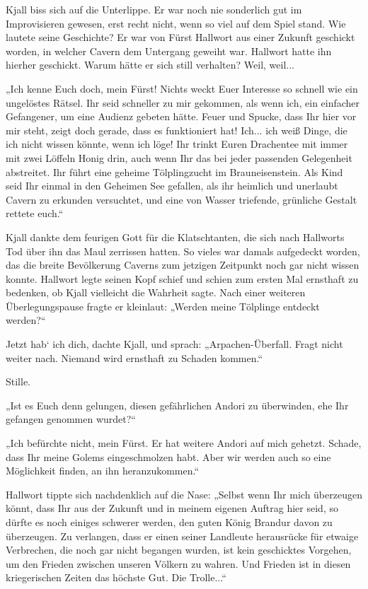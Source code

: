 \documentclass[10pt, a4paper, oneside]{book}
\begin{document}
Kjall biss sich auf die Unterlippe. Er war noch nie sonderlich gut im Improvisieren gewesen, erst recht nicht, wenn so viel auf dem Spiel stand. Wie lautete seine Geschichte? Er war von Fürst Hallwort aus einer Zukunft geschickt worden, in welcher Cavern dem Untergang geweiht war. Hallwort hatte ihn hierher geschickt. Warum hätte er sich still verhalten? Weil, weil...

„Ich kenne Euch doch, mein Fürst! Nichts weckt Euer Interesse so schnell wie ein ungelöstes Rätsel. Ihr seid schneller zu mir gekommen, als wenn ich, ein einfacher Gefangener, um eine Audienz gebeten hätte. Feuer und Spucke, dass Ihr hier vor mir steht, zeigt doch gerade, dass es funktioniert hat! Ich... ich weiß Dinge, die ich nicht wissen könnte, wenn ich löge! Ihr trinkt Euren Drachentee mit immer mit zwei Löffeln Honig drin, auch wenn Ihr das bei jeder passenden Gelegenheit abstreitet. Ihr führt eine geheime Tölplingzucht im Brauneisenstein. Als Kind seid Ihr einmal in den Geheimen See gefallen, als ihr heimlich und unerlaubt Cavern zu erkunden versuchtet, und eine von Wasser triefende, grünliche Gestalt rettete euch.“

Kjall dankte dem feurigen Gott für die Klatschtanten, die sich nach Hallworts Tod über ihn das Maul zerrissen hatten. So vieles war damals aufgedeckt worden, das die breite Bevölkerung Caverns zum jetzigen Zeitpunkt noch gar nicht wissen konnte. Hallwort legte seinen Kopf schief und schien zum ersten Mal ernsthaft zu bedenken, ob Kjall vielleicht die Wahrheit sagte. Nach einer weiteren Überlegungspause fragte er kleinlaut: „Werden meine Tölplinge entdeckt werden?“

Jetzt hab‘ ich dich, dachte Kjall, und sprach: „Arpachen-Überfall. Fragt nicht weiter nach. Niemand wird ernsthaft zu Schaden kommen.“

Stille.

„Ist es Euch denn gelungen, diesen gefährlichen Andori zu überwinden, ehe Ihr gefangen genommen wurdet?“

„Ich befürchte nicht, mein Fürst. Er hat weitere Andori auf mich gehetzt. Schade, dass Ihr meine Golems eingeschmolzen habt. Aber wir werden auch so eine Möglichkeit finden, an ihn heranzukommen.“

Hallwort tippte sich nachdenklich auf die Nase: „Selbst wenn Ihr mich überzeugen könnt, dass Ihr aus der Zukunft und in meinem eigenen Auftrag hier seid, so dürfte es noch einiges schwerer werden, den guten König Brandur davon zu überzeugen. Zu verlangen, dass er einen seiner Landleute herausrücke für etwaige Verbrechen, die noch gar nicht begangen wurden, ist kein geschicktes Vorgehen, um den Frieden zwischen unseren Völkern zu wahren. Und Frieden ist in diesen kriegerischen Zeiten das höchste Gut. Die Trolle...“
\end{document}
